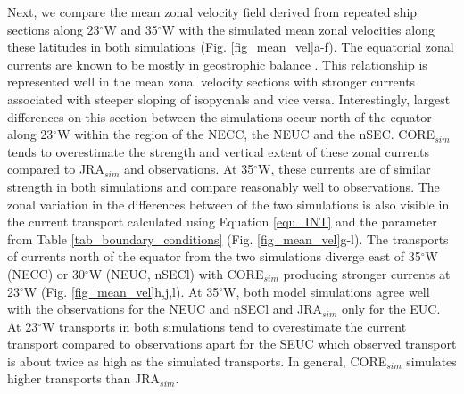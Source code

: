 \documentclass[os, manuscript]{copernicus}
\begin{document}
Next, we compare the mean zonal velocity field derived from repeated ship sections along 23$^{\circ}$W and 35$^{\circ}$W with the simulated mean zonal velocities along these latitudes in both simulations (Fig. \ref{fig_mean_vel}a-f). The equatorial zonal currents are known to be mostly in geostrophic balance \cite[e.g][]{Jochum2004,Brandt2010,Goes2013}. This relationship is represented well in the mean zonal velocity sections with stronger currents associated with steeper sloping of isopycnals and vice versa. Interestingly, largest differences on this section between the simulations occur north of the equator along 23$^{\circ}$W within the region of the NECC, the NEUC and the nSEC. CORE$_{sim}$ tends to overestimate the strength and vertical extent of these zonal currents compared to JRA$_{sim}$ and observations. At 35$^{\circ}$W, these currents are of similar strength in both simulations and compare reasonably well to observations.
The zonal variation in the differences between of the two simulations is also visible in the current transport calculated using Equation \ref{equ_INT} and the parameter from Table \ref{tab_boundary_conditions} (Fig. \ref{fig_mean_vel}g-l). The transports of currents north of the equator from the two simulations diverge east of 35$^{\circ}$W (NECC) or 30$^{\circ}$W (NEUC, nSECl) with CORE$_{sim}$ producing stronger currents at 23$^{\circ}$W (Fig. \ref{fig_mean_vel}h,j,l). At 35$^{\circ}$W, both model simulations agree well with the observations for the NEUC and nSECl and JRA$_{sim}$ only for the EUC. At 23$^{\circ}$W transports in both simulations tend to overestimate the current transport compared to observations apart for the SEUC which observed transport is about twice as high as the simulated transports. In general, CORE$_{sim}$ simulates higher transports than JRA$_{sim}$.
\end{document}
